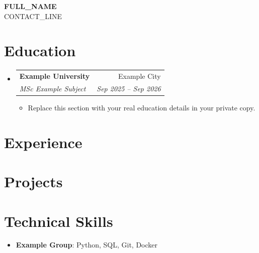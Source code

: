 \documentclass[a4paper,11pt]{article}
\makeatletter
\newcommand{\resumeSubheading}[4]{
  \vspace{-2pt}\item
    \begin{tabular*}{0.97\textwidth}{l@{\extracolsep{\fill}}r}
      \textbf{#1} & #2 \\
      \textit{\small #3} & \textit{\small #4} \\
    \end{tabular*}\vspace{-6pt}
}
\newcommand{\resumeSubHeadingListStart}{\begin{itemize}[leftmargin=0pt,label={}]}
\newcommand{\resumeSubHeadingListEnd}{\end{itemize}}
\newcommand{\resumeItemListStart}{\begin{itemize}[leftmargin=14pt,topsep=2pt,itemsep=1pt,parsep=0pt,partopsep=0pt]}
\newcommand{\resumeItemListEnd}{\end{itemize}\vspace{-6pt}}
\makeatother
\begin{document}
\begin{center}
    {\LARGE \textbf{{{FULL_NAME}}}}\\[4pt]
    {{CONTACT_LINE}}
\end{center}

\section{Education}
\resumeSubHeadingListStart
  \resumeSubheading
    {Example University}{Example City}
    {MSc Example Subject}{Sep 2025 -- Sep 2026}
    \resumeItemListStart
      \item \small{Replace this section with your real education details in your private copy.}
    \resumeItemListEnd
\resumeSubHeadingListEnd

\section{Experience}
\resumeSubHeadingListStart
\resumeSubHeadingListEnd

\section{Projects}
\resumeSubHeadingListStart
\resumeSubHeadingListEnd

\section{Technical Skills}
\resumeSubHeadingListStart
  \item{
    \textbf{Example Group}{: Python, SQL, Git, Docker} \\
  }
\resumeSubHeadingListEnd
\end{document}

